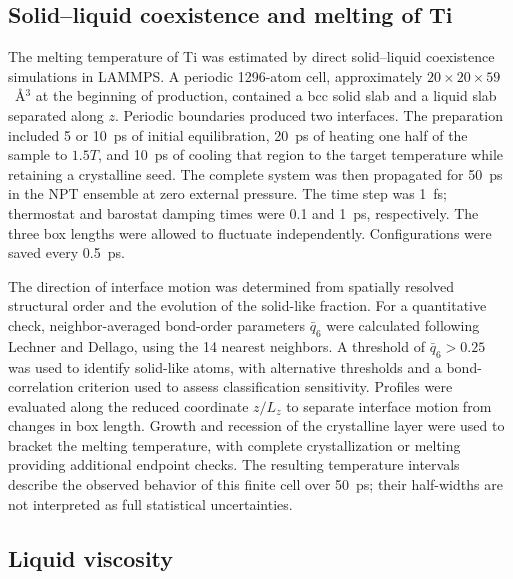 
\subsection{Solid--liquid coexistence and melting of Ti}
\label{sec:melting}

The melting temperature of Ti was estimated by direct solid--liquid coexistence simulations in LAMMPS.\cite{Thompson2022}
A periodic 1296-atom cell, approximately $20\times20\times59$~\AA$^3$ at the beginning of production, contained a bcc solid slab and a liquid slab separated along $z$.
Periodic boundaries produced two interfaces.
The preparation included 5 or 10~ps of initial equilibration, 20~ps of heating one half of the sample to $1.5T$, and 10~ps of cooling that region to the target temperature while retaining a crystalline seed.
The complete system was then propagated for 50~ps in the NPT ensemble at zero external pressure.
The time step was 1~fs; thermostat and barostat damping times were 0.1 and 1~ps, respectively.
The three box lengths were allowed to fluctuate independently.
Configurations were saved every 0.5~ps.

The direction of interface motion was determined from spatially resolved structural order and the evolution of the solid-like fraction.
For a quantitative check, neighbor-averaged bond-order parameters $\bar q_6$ were calculated following Lechner and Dellago,\cite{Lechner2008} using the 14 nearest neighbors.
A threshold of $\bar q_6>0.25$ was used to identify solid-like atoms, with alternative thresholds and a bond-correlation criterion used to assess classification sensitivity.
Profiles were evaluated along the reduced coordinate $z/L_z$ to separate interface motion from changes in box length.
Growth and recession of the crystalline layer were used to bracket the melting temperature, with complete crystallization or melting providing additional endpoint checks.
The resulting temperature intervals describe the observed behavior of this finite cell over 50~ps; their half-widths are not interpreted as full statistical uncertainties.

\subsection{Liquid viscosity}
\label{sec:viscosity}

